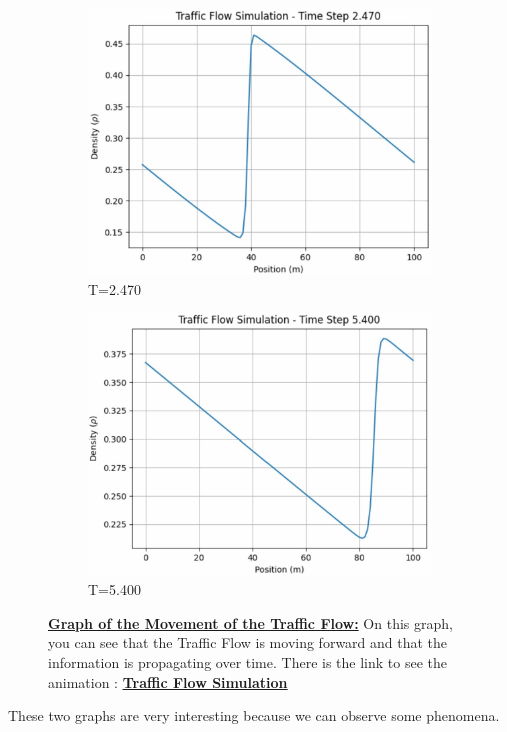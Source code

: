 \documentclass{article}
\begin{document}
\begin{figure}[H]
		\begin{subfigure}{0.4\textwidth}
			\centering
			\includegraphics[width=\textwidth]{AniE3.jpg}
			\caption{T=2.470}
			\label{fig:graph3}
		\end{subfigure}
		\begin{subfigure}{0.4\textwidth}
			\centering
			\includegraphics[width=\textwidth]{AniE4.jpg}
			\caption{T=5.400}
			\label{fig:graph4}
		\end{subfigure}
		\caption[Graph of the Movement of the Traffic Flow]{\textbf{\underline{Graph of the Movement of the Traffic Flow:}} On this graph, you can see that the Traffic Flow is moving forward and that the information is propagating over time. There is the link to see the animation : \href{https://github.com/FlorentGerbaud/Simple-road-traffic-modeling/blob/Flo-PDE/SRTM/EDPMethod/CasTestToLaunch/TestToLaunch/Modele_IC_S/EulerExplicit/traffic_flow_animation.gif}{\textbf{\underline{Traffic Flow Simulation}}}}
		\label{fig:four_graphs}
	\end{figure} These two graphs are very interesting because we can observe some phenomena. 
\end{document}
